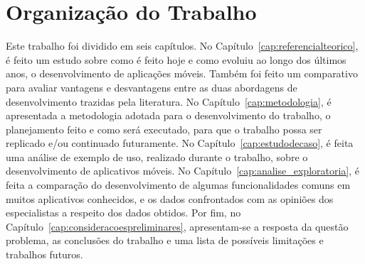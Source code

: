 \section{Organização do Trabalho}\label{sec:organizacao}

Este trabalho foi dividido em seis capítulos. %
No Capítulo~\ref{cap:referencialteorico}, é feito um estudo sobre como é feito hoje e como evoluiu ao longo dos últimos anos, o desenvolvimento de aplicações 
móveis. Também foi feito um comparativo para avaliar vantagens e desvantagens entre as duas abordagens de desenvolvimento trazidas pela literatura. 
No Capítulo~\ref{cap:metodologia}, é apresentada a metodologia adotada para o desenvolvimento do trabalho, o planejamento feito e como será executado, para que 
o trabalho possa ser replicado e/ou continuado futuramente.  
No Capítulo~\ref{cap:estudodecaso}, é feita uma análise de exemplo de uso, realizado durante o trabalho, sobre o desenvolvimento de aplicativos móveis.
No Capítulo~\ref{cap:analise_exploratoria}, é feita a comparação do desenvolvimento de algumas funcionalidades comuns em muitos aplicativos conhecidos, e os dados confrontados com as opiniões dos especialistas a respeito 
dos dados obtidos. Por fim, no Capítulo~\ref{cap:consideracoespreliminares}, apresentam-se a resposta da questão problema, as conclusões do trabalho e uma lista de possíveis limitações e trabalhos futuros.  
